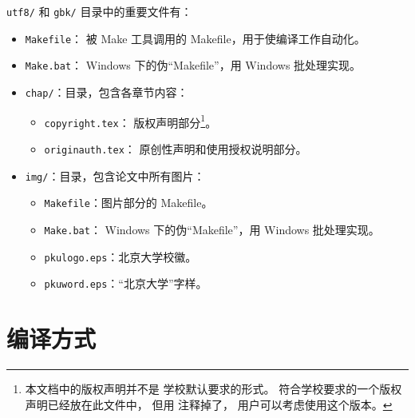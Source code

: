 	\verb|utf8/| 和 \verb|gbk/| 目录中的重要文件有：
	\begin{itemize}
		\item \verb|Makefile|：
			被 Make 工具调用的 Makefile，用于使编译工作自动化。
		\item \verb|Make.bat|：%
			Windows 下的伪“Makefile”，用 Windows 批处理实现。

		\item \verb|chap/|：目录，包含各章节内容：
		\begin{itemize}
			\item \verb|copyright.tex|：
				版权声明部分\footnote{%
					本文档中的版权声明并不是%
					学校默认要求的形式\supercite{pku-copyright}。
					符合学校要求的一个版权声明已经放在此文件中，
					但用 \texttt{\string\iffalse{} ...\ \string\fi} %
					注释掉了，
					用户可以考虑使用这个版本。
				}。
			\item \verb|originauth.tex|：
				原创性声明和使用授权说明部分\supercite{pku-originauth}。
		\end{itemize}

		\item \verb|img/|：目录，包含论文中所有图片：
		\begin{itemize}
			\item \verb|Makefile|：图片部分的 Makefile。
			\item \verb|Make.bat|：%
				Windows 下的伪“Makefile”，用 Windows 批处理实现。
			\item \verb|pkulogo.eps|：北京大学校徽。
			\item \verb|pkuword.eps|：“北京大学”字样。
		\end{itemize}
	\end{itemize}

	\section{编译方式}\label{sec:compile}

